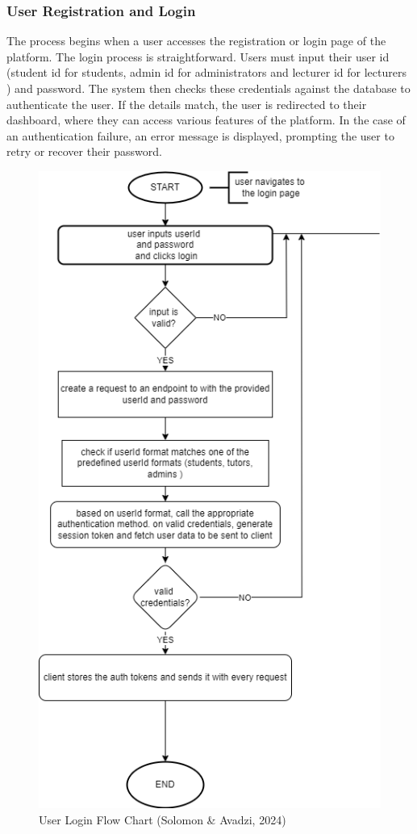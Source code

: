 \documentclass[a4paper,12pt]{article}  %
\begin{document}
\subsubsection{User Registration and Login}
The process begins when a user accesses the registration or login page of the
platform. The login process is straightforward. Users must input their user id
(student id for students, admin id for administrators and lecturer id for
lecturers ) and password. The system then checks these credentials against the
database to authenticate the user. If the details match, the user is redirected
to their dashboard, where they can access various features of the platform. In
the case of an authentication failure, an error message is displayed, prompting
the user to retry or recover their password.\\
\begin{figure}[H]
      \centering
      \includegraphics[width=1\textwidth]{figures/login flowchart.drawio.png}
      \caption{User Login Flow Chart (Solomon \& Avadzi, 2024)}
\end{figure}
\end{document}
